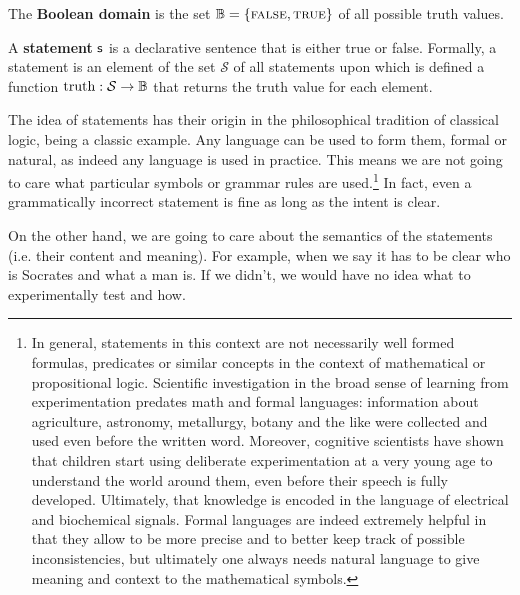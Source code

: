 \documentclass[11pt,letterpaper,fleqn]{memoir} %
\begin{document}
\begin{mathSection}
\begin{defn}
	The \textbf{Boolean domain} is the set $\mathbb{B} = \{\textsc{false}, \textsc{true}\}$ of all possible truth values.
\end{defn}


\begin{axiom}\label{def_statement}
	A \textbf{statement} $\mathsf{s}$ is a declarative sentence that is either true or false. Formally, a statement is an element of the set $\mathcal{S}$ of all statements upon which is defined a function $\operatorname{truth}: \mathcal{S} \to \mathbb{B}$ that returns the truth value for each element.
\end{axiom}

\end{mathSection}

The idea of statements has their origin in the philosophical tradition of classical logic,  being a classic example. Any language can be used to form them, formal or natural, as indeed any language is used in practice. This means we are not going to care what particular symbols or grammar rules are used.\footnote{In general, statements in this context are not necessarily well formed formulas, predicates or similar concepts in the context of mathematical or propositional logic. Scientific investigation in the broad sense of learning from experimentation predates math and formal languages: information about agriculture, astronomy, metallurgy, botany and the like were collected and used even before the written word. Moreover, cognitive scientists have shown that children start using deliberate experimentation at a very young age to understand the world around them, even before their speech is fully developed. Ultimately, that knowledge is encoded in the language of electrical and biochemical signals. Formal languages are indeed extremely helpful in that they allow to be more precise and to better keep track of possible inconsistencies, but ultimately one always needs natural language to give meaning and context to the mathematical symbols.} In fact, even a grammatically incorrect statement is fine as long as the intent is clear.

On the other hand, we are going to care about the semantics of the statements (i.e. their content and meaning). For example, when we say  it has to be clear who is Socrates and what a man is. If we didn't, we would have no idea what to experimentally test and how.
\end{document}

